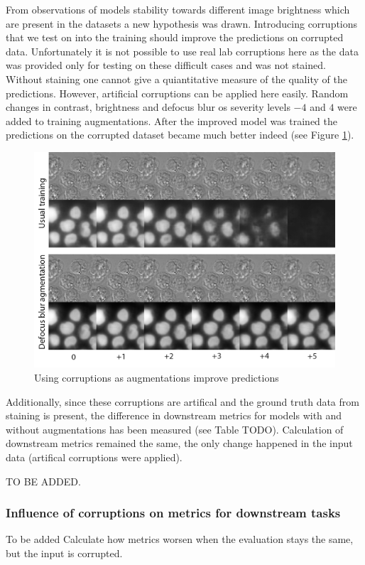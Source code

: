 From observations of models stability towards different image brightness which are present in the datasets a new hypothesis was drawn. Introducing corruptions that we test on into the training should improve the predictions on corrupted data. Unfortunately it is not possible to use real lab corruptions here as the data was provided only for testing on these difficult cases and was not stained. Without staining one cannot give a quiantitative measure of the quality of the predictions. However, artificial corruptions can be applied here easily. Random changes in contrast, brightness and defocus blur os severity levels $-4$ and $4$ were added to training augmentations. After the improved model was trained the predictions on the corrupted dataset became much better indeed (see Figure \ref{fig:augments-help}).

\begin{figure}[htb]
	\begin{center}
		\includegraphics[width=0.8\linewidth]{bilder/stability/augments-help.png}
		\caption{Using corruptions as augmentations improve predictions}\label{fig:augments-help}
	\end{center}
\end{figure}

Additionally, since these corruptions are artifical and the ground truth data from staining is present, the difference in downstream metrics for models with and without augmentations has been measured (see Table TODO). Calculation of downstream metrics remained the same, the only change happened in the input data (artifical corruptions were applied).

TO BE ADDED.

\subsubsection{Influence of corruptions on metrics for downstream tasks}
To be added
Calculate how metrics worsen when the evaluation stays the same, but the input is corrupted.
